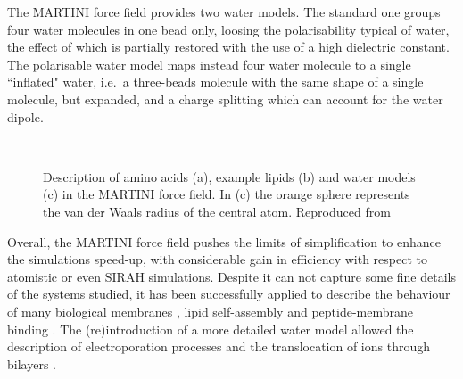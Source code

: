 The MARTINI force field provides two water models. The standard one groups four water molecules in one bead only, loosing the polarisability typical of water, the effect of which is partially restored with the use of a high dielectric constant. The polarisable water model \cite{Yesylevskyy2010} maps instead four water molecule to a single ``inflated" water, i.e.\ a three-beads molecule with the same shape of a single molecule, but expanded, and a charge splitting which can account for the water dipole.
%
\begin{figure}[t!]
\centering
{} \\
%
\caption[MARTINI force field mapping for amino acids, lipids and water]{Description of amino acids (a), example lipids (b) and water models (c) in the MARTINI force field. In (c) the orange sphere represents the van der Waals radius of the central atom. Reproduced from \citet{Monticelli2008,calgary_site,Yesylevskyy2010}}
\label{fig:martini}
\end{figure}
%
Overall, the MARTINI force field pushes the limits of simplification to enhance the simulations speed-up, with considerable gain in efficiency with respect to atomistic or even SIRAH simulations. Despite it can not capture some fine details of the systems studied, it has been successfully applied to describe the behaviour of many biological membranes \citep{Khalid2019,Samsudin2017}, lipid self-assembly \citep{Marrink2007} and peptide-membrane binding \citep{Song2019}. The (re)introduction of a more detailed water model allowed the description of electroporation processes and the translocation of ions through bilayers \citep{Yesylevskyy2010}.

